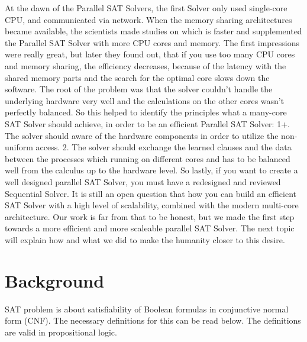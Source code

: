 \documentclass{article}
\begin{document}
At the dawn of the Parallel SAT Solvers, the first Solver only used single-core CPU, and communicated via network. When the memory sharing architectures became available, the scientists made studies on which is faster and supplemented the Parallel SAT Solver with more CPU cores and memory. The first impressions were really great, but later they found out, that if you use too many CPU cores and memory sharing, the efficiency decreases, because of the latency with the shared memory parts and the search for the optimal core slows down the software. The root of the problem was that the solver couldn't handle the underlying hardware very well and the calculations on the other cores wasn't perfectly balanced. So this helped to identify the principles what a many-core SAT Solver should achieve, in order to be an efficient Parallel SAT Solver:
1+. The solver should aware of the hardware components in order to utilize the non-uniform access.
2. The solver should exchange the learned clauses and the data between the processes which running on different cores and has to be balanced well from the calculus up to the hardware level.
So lastly, if you want to create a well designed parallel SAT Solver, you must have a redesigned and reviewed Sequential Solver. It is still an open question that how you can build an efficient SAT Solver with a high level of scalability, combined with the modern multi-core architecture.
Our work is far from that to be honest, but we made the first step towards a more efficient and more scaleable parallel SAT Solver. The next topic will explain how and what we did to make the humanity closer to this desire.

\section{Background}
\label{sec:background}

SAT problem is about satisfiability of Boolean formulas in conjunctive normal form (CNF). The necessary definitions for this can be read below. The definitions are valid in propositional logic.
\end{document}
